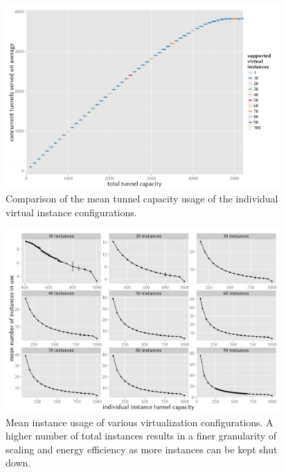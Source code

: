 \documentclass{beamer}
\begin{document}
\begin{frame}
	\begin{figure}
		\includegraphics[height=7cm]{../../chapters/041-mobilenetsmeasuring/images/R-virtualized-tunnelusage.pdf}
		\caption{Comparison of the mean tunnel capacity usage of the individual virtual instance configurations.}
	\end{figure}
\end{frame}

\begin{frame}
	\begin{figure}
		\includegraphics[height=7cm]{../../chapters/041-mobilenetsmeasuring/images/R-virtualized-mean-instanceusage.pdf}
		\caption{Mean instance usage of various virtualization configurations. A higher number of total instances results in a finer granularity of scaling and energy efficiency as more instances can be kept shut down.}
	\end{figure}
\end{frame}
\end{document}
